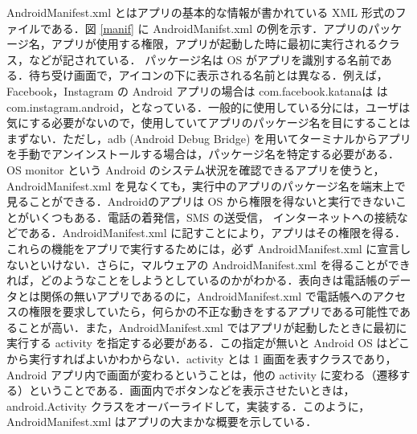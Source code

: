 AndroidManifest.xml とはアプリの基本的な情報が書かれている XML 形式のファイルである．図 \ref{manif} に AndroidManifst.xml の例を示す．アプリのパッケージ名，アプリが使用する権限，アプリが起動した時に最初に実行されるクラス，などが記されている． パッケージ名は OS がアプリを識別する名前である．待ち受け画面で，アイコンの下に表示される名前とは異なる．例えば，Facebook，Instagram の Android アプリの場合は com.facebook.katanaは  は com.instagram.android，となっている．一般的に使用している分には，ユーザは気にする必要がないので，使用していてアプリのパッケージ名を目にすることはまずない．ただし，adb (Android Debug Bridge) を用いてターミナルからアプリを手動でアンインストールする場合は，パッケージ名を特定する必要がある．OS monitor という Android のシステム状況を確認できるアプリを使うと，AndroidManifest.xml を見なくても，実行中のアプリのパッケージ名を端末上で見ることができる．Androidのアプリは OS から権限を得ないと実行できないことがいくつもある．電話の着発信，SMS の送受信， インターネットへの接続などである．AndroidManifest.xml に記すことにより，アプリはその権限を得る．これらの機能をアプリで実行するためには，必ず AndroidManifest.xml に宣言しないといけない．さらに，マルウェアの AndroidManifest.xml を得ることができれば，どのようなことをしようとしているのかがわかる．表向きは電話帳のデータとは関係の無いアプリであるのに，AndroidManifest.xml で電話帳へのアクセスの権限を要求していたら，何らかの不正な動きをするアプリである可能性であることが高い．また，AndroidManifest.xml ではアプリが起動したときに最初に実行する activity を指定する必要がある．この指定が無いと Android OS はどこから実行すればよいかわからない．activity とは 1 画面を表すクラスであり，Android アプリ内で画面が変わるということは，他の activity に変わる（遷移する）ということである．画面内でボタンなどを表示させたいときは，android.Activity クラスをオーバーライドして，実装する．このように，AndroidManifest.xml はアプリの大まかな概要を示している．

